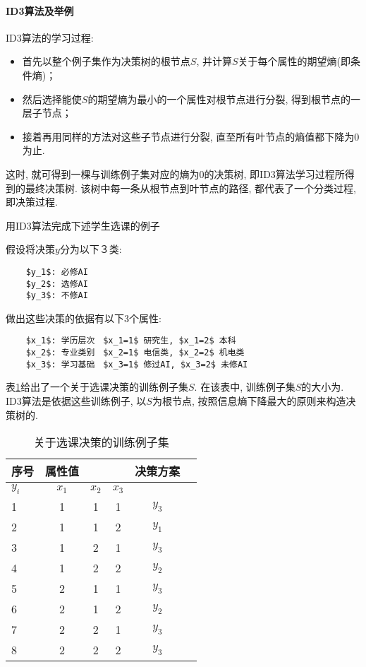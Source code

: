 \paragraph{ID3算法及举例}
ID3算法的学习过程:
\begin{itemize}
\item 首先以整个例子集作为决策树的根节点$S$, 并计算$S$关于每个属性的期望熵(即条件熵)；
\item 然后选择能使$S$的期望熵为最小的一个属性对根节点进行分裂, 得到根节点的一层子节点；
\item 接着再用同样的方法对这些子节点进行分裂, 直至所有叶节点的熵值都下降为0为止.
\end{itemize}
这时, 就可得到一棵与训练例子集对应的熵为0的决策树, 即ID3算法学习过程所得到的最终决策树. 该树中每一条从根节点到叶节点的路径, 都代表了一个分类过程, 即决策过程.

\begin{example}
用ID3算法完成下述学生选课的例子

假设将决策$y$分为以下３类:
\begin{Verbatim}
    $y_1$: 必修AI
    $y_2$: 选修AI
    $y_3$: 不修AI
\end{Verbatim}

做出这些决策的依据有以下3个属性:
\begin{Verbatim}
    $x_1$: 学历层次　$x_1=1$ 研究生, $x_1=2$ 本科
    $x_2$: 专业类别　$x_2=1$ 电信类, $x_2=2$ 机电类
    $x_3$: 学习基础　$x_3=1$ 修过AI, $x_3=2$ 未修AI
\end{Verbatim}
\end{example}

表\ref{AItable20122435}给出了一个关于选课决策的训练例子集$S$. 在该表中, 训练例子集$S$的大小为. ID3算法是依据这些训练例子, 以$S$为根节点, 按照信息熵下降最大的原则来构造决策树的.
\begin{table} [!tb]
\caption{关于选课决策的训练例子集}
\begin{center}
\begin{tabular} {lccccc}
\hline
序号&	属性值	&&&决策方案\\
\hline
$y_i$&$x_1$&$x_2$&$x_3$\\
1	&1	&1	&1&	$y_3$\\
2	&1&	1&	2&	$y_1$\\
3	&1&2&1&$y_3$\\
4&1&2&2&$y_2$\\
5&2&1&1&$y_3$\\
6&2&1&2&$y_2$\\
7&2&2&1&$y_3$\\
8&2&2&2&$y_3$\\
\hline
\end{tabular}
\end{center}
\label{AItable20122435}
\end{table}

